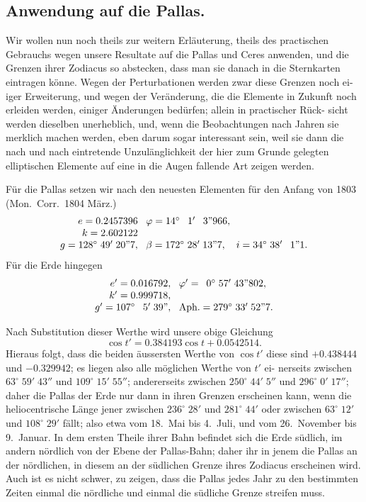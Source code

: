 \documentclass[12pt,a4paper]{article}
\begin{document}
\subsection{Anwendung auf die Pallas.}

Wir wollen nun noch theils zur weitern Erläuterung, theils des practischen
Gebrauchs wegen unsere Resultate auf die Pallas und Ceres anwenden, und die
Grenzen ihrer Zodiacus so abstecken, dass man sie danach in die Sternkarten
eintragen könne. Wegen der Perturbationen werden zwar diese Grenzen noch ei-
iger Erweiterung, und wegen der Veränderung, die die Elemente in Zukunft
noch erleiden werden, einiger Änderungen bedürfen; allein in practischer Rück-
sicht werden dieselben unerheblich, und, wenn die Beobachtungen nach Jahren
sie merklich machen werden, eben darum sogar interessant sein, weil sie dann
die nach und nach eintretende Unzulänglichkeit der hier zum Grunde gelegten
elliptischen Elemente auf eine in die Augen fallende Art zeigen werden.

Für die Pallas setzen wir nach den neuesten Elementen für den Anfang
von 1803 (Mon.\ Corr.\ 1804 März.)
\[
\begin{array}{r@{\;\;\;}l}
e = 0.2457396 & \varphi = 14^{\circ}\;\phantom{0}1'\;\phantom{0}3\text{''}966,\\
k = 2.602122 & \\
g = 128^{\circ}\;49'\;20\text{''}7, & \beta = 172^{\circ}\;28'\;13\text{''}7,\quad i = 34^{\circ}\;38'\;\phantom{0}1\text{''}1.
\end{array}
\]
Für die Erde hingegen
\[
\begin{array}{r@{\;\;\;}l}
e' = 0.016792, & \varphi' = \phantom{0}0^{\circ}\;57'\;43\text{''}802,\\
k' = 0.999718, & \\
g' = 107^{\circ}\;\phantom{0}5'\;39\text{''}, & \text{Aph.} = 279^{\circ}\;33'\;52\text{''}7.
\end{array}
\]

Nach Substitution dieser Werthe wird unsere obige Gleichung
\[
\cos t' = 0.384193\cos t + 0.0542514.
\]
Hieraus folgt, dass die beiden äussersten Werthe von $\cos t'$ diese sind
$+0.438444$ und $-0.329942$; es liegen also alle möglichen Werthe von $t'$ ei-
nerseits zwischen $63^{\circ}\;59'\;43''$ und $109^{\circ}\;15'\;55''$; andererseits zwischen
$250^{\circ}\;44'\;5''$ und $296^{\circ}\;0'\;17''$; daher die Pallas der Erde nur dann
in ihren Grenzen erscheinen kann, wenn die heliocentrische Länge jener zwischen
$236^{\circ}\;28'$ und $281^{\circ}\;44'$ oder zwischen $63^{\circ}\;12'$ und $108^{\circ}\;29'$ fällt;
also etwa vom 18.\ Mai bis 4.\ Juli, und vom 26.\ November bis 9.\ Januar.
In dem ersten Theile ihrer Bahn befindet sich die Erde südlich, im andern
nördlich von der Ebene der Pallas-Bahn; daher ihr in jenem die Pallas an der
nördlichen, in diesem an der südlichen Grenze ihres Zodiacus erscheinen wird.
Auch ist es nicht schwer, zu zeigen, dass die Pallas jedes Jahr zu den bestimmten
Zeiten einmal die nördliche und einmal die südliche Grenze streifen muss.
\end{document}
